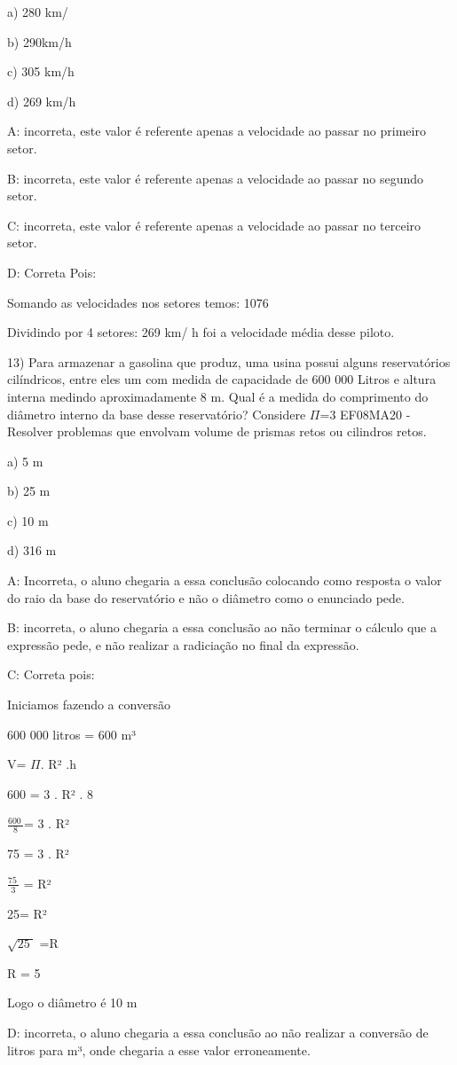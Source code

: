 a) 280 km/

b) 290km/h

c) 305 km/h

d) 269 km/h

A: incorreta, este valor é referente apenas a velocidade ao passar no
primeiro setor.

B: incorreta, este valor é referente apenas a velocidade ao passar no
segundo setor.

C: incorreta, este valor é referente apenas a velocidade ao passar no
terceiro setor.

D: Correta Pois:

Somando as velocidades nos setores temos: 1076

Dividindo por 4 setores: 269 km/ h foi a velocidade média desse piloto.

13) Para armazenar a gasolina que produz, uma usina possui alguns
reservatórios cilíndricos, entre eles um com medida de capacidade de 600
000 Litros e altura interna medindo aproximadamente 8 m. Qual é a medida
do comprimento do diâmetro interno da base desse reservatório? Considere
\(\Pi\)=3 EF08MA20 - Resolver problemas que envolvam volume de prismas
retos ou cilindros retos.

a) 5 m

b) 25 m

c) 10 m

d) 316 m

A: Incorreta, o aluno chegaria a essa conclusão colocando como resposta
o valor do raio da base do reservatório e não o diâmetro como o
enunciado pede.

B: incorreta, o aluno chegaria a essa conclusão ao não terminar o
cálculo que a expressão pede, e não realizar a radiciação no final da
expressão.

C: Correta pois:

Iniciamos fazendo a conversão

600 000 litros = 600 m³

V= \(\Pi\). R² .h

600 = 3 . R² . 8

\(\frac{600\ }{8}\)= 3 . R²

75 = 3 . R²

\(\frac{75\ }{3}\) = R²

25= R²

\(\sqrt{25\ }\) =R

R = 5

Logo o diâmetro é 10 m

D: incorreta, o aluno chegaria a essa conclusão ao não realizar a
conversão de litros para m³, onde chegaria a esse valor erroneamente.

